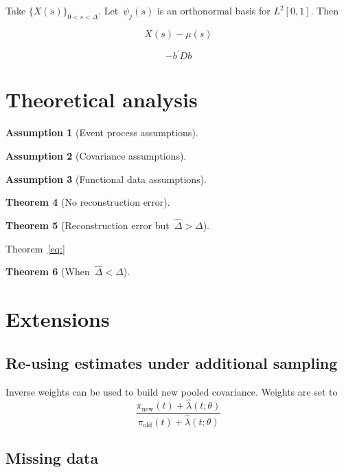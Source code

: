 \documentclass[11pt]{amsart}
\newtheorem{thm}{Theorem}[section]
\newtheorem{assumption}[thm]{Assumption}
\begin{document}
Take $\{ X (s) \}_{0 < s < \Delta}$. Let~$\psi_{j} (s)$ is an
orthonormal basis for $L^2 [ 0,1 ]$.  Then

\[
X(s) - \mu(s) 
\]

\[
- b^\prime D b
\]

\section{Theoretical analysis}

\begin{assumption}[Event process assumptions]

\end{assumption}

\begin{assumption}[Covariance assumptions]

\end{assumption}

\begin{assumption}[Functional data assumptions]

\end{assumption}

\begin{thm}[No reconstruction error]

\end{thm}

\begin{thm}[Reconstruction error but~$\hat \Delta > \Delta$]
\label{eq:biaseddown}
\end{thm}

Theorem~\ref{eq:}



\begin{thm}[When~$\hat \Delta < \Delta$] 

\end{thm}

\section{Extensions}

\subsection{Re-using estimates under additional sampling}
Inverse weights can be used to build new pooled covariance.
Weights are set to
\[
\frac{\pi_{\text{new}} (t) + \hat \lambda (t; \theta)}{\pi_{\text{old}} (t) + \hat \lambda (t; \theta)}
\]

\subsection{Missing data}
\label{section:missingdata}
\end{document}
